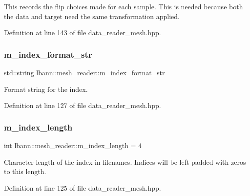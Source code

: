 This records the flip choices made for each sample. This is needed because both the data and target need the same transformation applied. 

Definition at line 143 of file data\+\_\+reader\+\_\+mesh.\+hpp.

\mbox{\label{classlbann_1_1mesh__reader_ae30866c8ae510d06eb63264de35917be}} 
\subsubsection{\texorpdfstring{m\+\_\+index\+\_\+format\+\_\+str}{m\_index\_format\_str}}
{\footnotesize\ttfamily std\+::string lbann\+::mesh\+\_\+reader\+::m\+\_\+index\+\_\+format\+\_\+str\hspace{0.3cm}{\ttfamily [protected]}}



Format string for the index. 



Definition at line 127 of file data\+\_\+reader\+\_\+mesh.\+hpp.

\mbox{\label{classlbann_1_1mesh__reader_a43c1aec4b0f635f6f7bf52944ace1883}} 
\subsubsection{\texorpdfstring{m\+\_\+index\+\_\+length}{m\_index\_length}}
{\footnotesize\ttfamily int lbann\+::mesh\+\_\+reader\+::m\+\_\+index\+\_\+length = 4\hspace{0.3cm}{\ttfamily [protected]}}

Character length of the index in filenames. Indices will be left-\/padded with zeros to this length. 

Definition at line 125 of file data\+\_\+reader\+\_\+mesh.\+hpp.

\mbox{\label{classlbann_1_1mesh__reader_a43bcee9494e51c397af690eb0291b168}} 
